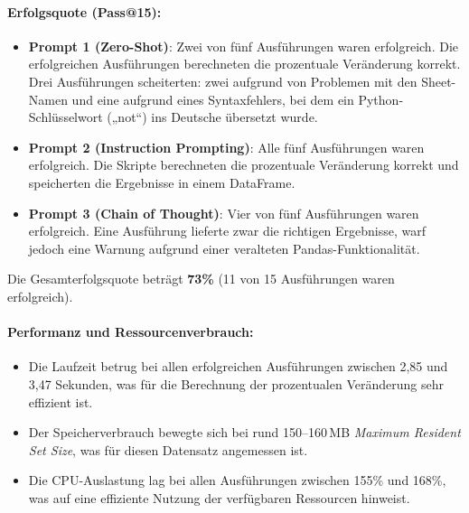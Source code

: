 \documentclass[11pt,a4paper]{article}
\begin{document}
\paragraph{Erfolgsquote (Pass@15):}
\begin{itemize}
    \item \textbf{Prompt 1 (Zero-Shot)}: Zwei von fünf Ausführungen waren erfolgreich. Die erfolgreichen Ausführungen berechneten die prozentuale Veränderung korrekt. Drei Ausführungen scheiterten: zwei aufgrund von Problemen mit den Sheet-Namen und eine aufgrund eines Syntaxfehlers, bei dem ein Python-Schlüsselwort („not“) ins Deutsche übersetzt wurde.
    \item \textbf{Prompt 2 (Instruction Prompting)}: Alle fünf Ausführungen waren erfolgreich. Die Skripte berechneten die prozentuale Veränderung korrekt und speicherten die Ergebnisse in einem DataFrame.
    \item \textbf{Prompt 3 (Chain of Thought)}: Vier von fünf Ausführungen waren erfolgreich. Eine Ausführung lieferte zwar die richtigen Ergebnisse, warf jedoch eine Warnung aufgrund einer veralteten Pandas-Funktionalität.
\end{itemize}
Die Gesamterfolgsquote beträgt \textbf{73\%} (11 von 15 Ausführungen waren erfolgreich).
\begin{table}[h]
    \centering
    \caption{Ergebnisse von Testfall 4}
    \label{tab:auswertung_testfall4}
\end{table}

\paragraph{Performanz und Ressourcenverbrauch:}
\begin{itemize}
    \item Die Laufzeit betrug bei allen erfolgreichen Ausführungen zwischen 2,85 und 3,47 Sekunden, was für die Berechnung der prozentualen Veränderung sehr effizient ist.
    \item Der Speicherverbrauch bewegte sich bei rund 150--160\,MB \emph{Maximum Resident Set Size}, was für diesen Datensatz angemessen ist.
    \item Die CPU-Auslastung lag bei allen Ausführungen zwischen 155\% und 168\%, was auf eine effiziente Nutzung der verfügbaren Ressourcen hinweist.
\end{itemize}
\end{document}
